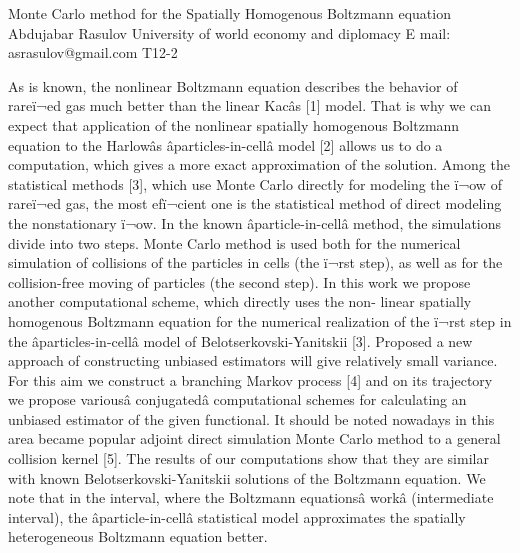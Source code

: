 \begin{talk}
  {Monte Carlo method for the Spatially Homogenous Boltzmann equation}
  {Abdujabar Rasulov}%
  {University of world economy and diplomacy}%
  {E mail: asrasulov@gmail.com}%
 {}%
{T12-2}%
			
As is known, the nonlinear Boltzmann equation describes the behavior of rareï¬ed gas much better than the linear Kacâs [1] model. That is why we can expect that application of the nonlinear spatially homogenous Boltzmann equation to the Harlowâs âparticles-in-cellâ model [2] allows us to do a computation, which gives a more exact approximation of the solution. 
Among the statistical methods [3], which use Monte Carlo directly for modeling the ï¬ow of rareï¬ed gas, the most efï¬cient one is the statistical method of direct modeling the nonstationary ï¬ow. 
In the known âparticle-in-cellâ method, the simulations divide into two steps. Monte Carlo method is used both for the numerical simulation of collisions of the particles in cells (the ï¬rst step), as well as for the collision-free moving of particles (the second step). 
In this work we propose another computational scheme, which directly uses the non- linear spatially homogenous Boltzmann equation for the numerical realization of the ï¬rst step in the âparticles-in-cellâ model of Belotserkovski-Yanitskii [3]. Proposed a new approach of constructing unbiased estimators will give relatively small variance.
 For this aim we construct a branching Markov process [4] and on its trajectory we propose variousâ conjugatedâ computational schemes for calculating an unbiased estimator of the given functional. It should be noted nowadays in this area became popular adjoint direct simulation Monte Carlo method to a general collision kernel [5].  
The results of our computations show that they are similar with known Belotserkovski-Yanitskii solutions of the Boltzmann equation. We note that in the interval, where the Boltzmann equationsâ workâ (intermediate interval), the âparticle-in-cellâ statistical model approximates the spatially heterogeneous Boltzmann equation better. 

\medskip


\end{talk}
